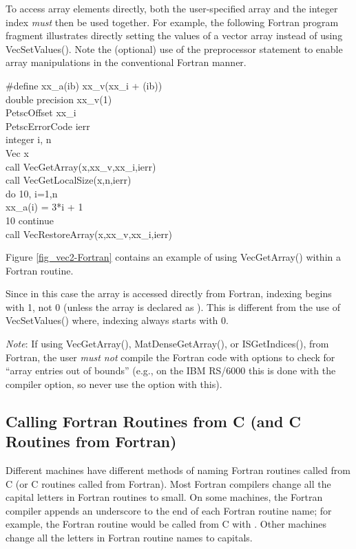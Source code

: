 To access array elements directly, both the user-specified array and
the integer index {\em must} then be used together.
For example, the following Fortran program fragment illustrates
directly setting the values of a vector array instead of using VecSetValues().  Note the (optional) use of the preprocessor
 statement to enable array manipulations in the conventional
Fortran manner.
\begin{tabbing}
   \#define xx\_a(ib)  xx\_v(xx\_i + (ib))\\

    double precision xx\_v(1)\\
    PetscOffset      xx\_i\\
    PetscErrorCode ierr\\
    integer          i, n\\
    Vec              x\\
    call VecGetArray(x,xx\_v,xx\_i,ierr)\\
    call VecGetLocalSize(x,n,ierr)\\
    do 10, i=1,n\\
       xx\_a(i) = 3*i + 1\\
 10 continue\\
    call VecRestoreArray(x,xx\_v,xx\_i,ierr)
\end{tabbing}
Figure \ref{fig_vec2-Fortran} contains an example of using VecGetArray()
within a Fortran routine.

Since in this case the array is accessed directly from Fortran,
indexing begins with 1, not 0 (unless the array is declared as ).
This is different from the use of VecSetValues()
where, indexing always starts with 0.

{\em Note}: If using VecGetArray(), MatDenseGetArray(), or ISGetIndices(),
from Fortran, the user {\em must not} compile the Fortran code with options
to check for ``array entries out of bounds'' (e.g., on the IBM RS/6000 this
is done with the  compiler option, so never use the  option with this).

\subsection{Calling Fortran Routines from C (and C Routines from Fortran)}


Different machines have
different methods of naming Fortran routines called from C
(or C routines called from Fortran). Most Fortran compilers change
all the capital letters in Fortran routines to small. On some machines, the
Fortran compiler appends an underscore to the end of each Fortran
routine name; for example, the Fortran routine 
would be called from C with .  Other machines
change all the letters in Fortran routine names to capitals.

